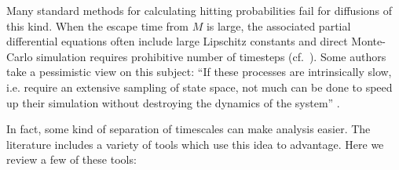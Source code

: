 \documentclass[12pt, nofootinbib,english, amsmath, amssymb, aps, priprint, graphicx,floatfix,draft]{revtex4-1}
\theoremstyle{plain}
\theoremstyle{definition}
\theoremstyle{plain}
\begin{document}
Many standard methods for calculating hitting probabilities fail for diffusions of this kind.  When the escape time from $M$ is large, the associated partial differential equations often include large Lipschitz constants and direct Monte-Carlo simulation requires prohibitive number of timesteps (cf.\ \cite{Baum1986-we, Wille1987-tf, Machta2009-gh}).  Some authors take a pessimistic view on this subject: ``If these processes are intrinsically slow, i.e. require an extensive sampling of state space, not much can be done to speed up their simulation without destroying the dynamics of the system'' \cite{Christen2008-ge}.

In fact, some kind of separation of timescales can make analysis easier.   The literature includes a variety of tools which use this idea to advantage.  Here we review a few of these tools:
\end{document}
